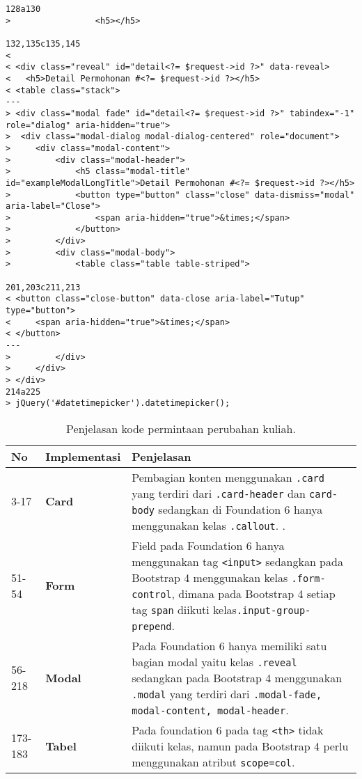 \begin{lstlisting}
128a130
>                 <h5></h5>

132,135c135,145
< 
< <div class="reveal" id="detail<?= $request->id ?>" data-reveal>
< 	<h5>Detail Permohonan #<?= $request->id ?></h5>
< <table class="stack">
---
> <div class="modal fade" id="detail<?= $request->id ?>" tabindex="-1" role="dialog" aria-hidden="true">
>  <div class="modal-dialog modal-dialog-centered" role="document">
>     <div class="modal-content">
>         <div class="modal-header">
>             <h5 class="modal-title" id="exampleModalLongTitle">Detail Permohonan #<?= $request->id ?></h5>
>             <button type="button" class="close" data-dismiss="modal" aria-label="Close">
>                 <span aria-hidden="true">&times;</span>
>             </button>
>         </div>
>         <div class="modal-body">
>             <table class="table table-striped">

201,203c211,213
< <button class="close-button" data-close aria-label="Tutup" type="button">
<     <span aria-hidden="true">&times;</span>
< </button>
---
>         </div>
>     </div>
> </div>
214a225
> jQuery('#datetimepicker').datetimepicker();
\end{lstlisting}

\begin{table}[H]
	\centering
	\caption{Penjelasan kode permintaan perubahan kuliah.}
	\begin{tabularx}{\textwidth}{llX}
		\toprule
		No & Implementasi     & Penjelasan \\
		\midrule
		3-17 & \textbf{Card} & Pembagian konten menggunakan \texttt{.card} yang terdiri dari \texttt{.card-header} dan \texttt{card-body} sedangkan di Foundation 6 hanya menggunakan kelas \texttt{.callout}. .\\
		51-54 & \textbf{Form}  & Field pada Foundation 6 hanya menggunakan tag \texttt{<input>} sedangkan pada Bootstrap 4 menggunakan kelas \texttt{.form-control}, dimana pada Bootstrap 4 setiap tag \texttt{span} diikuti kelas\texttt{.input-group-prepend}.\\
		56-218 & \textbf{Modal}  & Pada Foundation 6 hanya memiliki satu bagian modal yaitu kelas \texttt{.reveal} sedangkan pada Bootstrap 4 menggunakan \texttt{.modal} yang terdiri dari \texttt{.modal-fade, modal-content, modal-header}.\\
		173-183 &\textbf{Tabel} & Pada foundation 6 pada tag \texttt{<th>} tidak diikuti kelas, namun pada Bootstrap 4 perlu menggunakan atribut \texttt{scope=col}.\\
		\bottomrule
	\end{tabularx}%
	\label{tabel:permintaanPerubahanKuliah}
\end{table}

